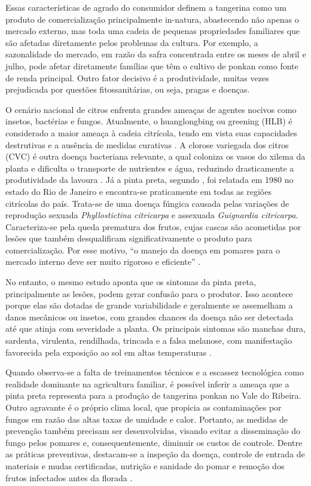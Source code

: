 Essas características de agrado do consumidor definem a tangerina como um produto de comercialização principalmente in-natura, abastecendo não apenas o mercado externo, mas toda uma cadeia de pequenas propriedades familiares que são afetadas diretamente pelos problemas da cultura. Por exemplo, a sazonalidade do mercado, em razão da safra concentrada entre os meses de abril e julho, pode afetar diretamente famílias que têm o cultivo de ponkan como fonte de renda principal. Outro fator decisivo é a produtividade, muitas vezes prejudicada por questões fitossanitárias, ou seja, pragas e doenças. 

O cenário nacional de citros enfrenta grandes ameaças de agentes nocivos como insetos, bactérias e fungos. Atualmente, o huanglongbing ou greening (HLB) é considerado a maior ameaça à cadeia citrícola, tendo em vista suas capacidades destrutivas e a ausência de medidas curativas \cite{rodrigues2016hlb}. A clorose variegada dos citros (CVC) é outra doença bacteriana relevante, a qual coloniza os vasos do xilema da planta e dificulta o transporte de nutrientes e água, reduzindo drasticamente a produtividade da lavoura \cite{Alves2003}. Já a pinta preta, segundo \textcite{SilvaJunior2016}, foi relatada em 1980 no estado do Rio de Janeiro e encontra-se praticamente em todas as regiões citrícolas do país. Trata-se de uma doença fúngica causada pelas variações de reprodução sexuada \emph{Phyllostictina citricarpa} e assexuada \emph{Guignardia citricarpa}. Caracteriza-se pela queda prematura dos frutos, cujas cascas são acometidas por lesões que também desqualificam significativamente o produto para comercialização. Por esse motivo, “o manejo da doença em pomares para o mercado interno deve ser muito rigoroso e eficiente” \cite{SilvaJunior2016}.

No entanto, o mesmo estudo aponta que os sintomas da pinta preta, principalmente as lesões, podem gerar confusão para o produtor. Isso acontece porque elas são dotadas de grande variabilidade e geralmente se assemelham a danos mecânicos ou insetos, com grandes chances da doença não ser detectada até que atinja com severidade a planta. Os principais sintomas são manchas dura, sardenta, virulenta, rendilhada, trincada e a falsa melanose, com manifestação favorecida pela exposição ao sol em altas temperaturas \cite{SilvaJunior2016}.

Quando observa-se a falta de treinamentos técnicos e a escassez tecnológica como realidade dominante na agricultura familiar, é possível inferir a ameaça que a pinta preta representa para a produção de tangerina ponkan no Vale do Ribeira. Outro agravante é o próprio clima local, que propicia as contaminações por fungos em razão das altas taxas de umidade e calor. Portanto, as medidas de prevenção também precisam ser desenvolvidas, visando evitar a disseminação do fungo pelos pomares e, consequentemente, diminuir os custos de controle. Dentre as práticas preventivas, destacam-se a inspeção da doença, controle de entrada de materiais e mudas certificadas, nutrição e sanidade do pomar e remoção dos frutos infectados antes da florada \cite{Fundecitrus2025}.

